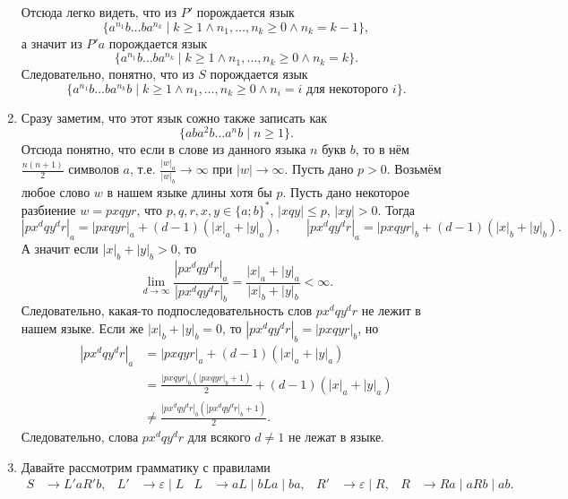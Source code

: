 \documentclass[12pt,a4paper]{article}
\begin{document}
\begin{problem}{3}
\begin{enumerate}
                Отсюда легко видеть, что из $P'$ порождается язык
                \[\{a^{n_1} b \dots b a^{n_k} \mid k \geqslant 1 \wedge n_1, \dots, n_k \geqslant 0 \wedge n_k = k-1\},\]
                а значит из $P'a$ порождается язык
                \[\{a^{n_1} b \dots b a^{n_k} \mid k \geqslant 1 \wedge n_1, \dots, n_k \geqslant 0 \wedge n_k = k\}.\]
                Следовательно, понятно, что из $S$ порождается язык
                \[\{a^{n_1} b \dots b a^{n_k} b \mid k \geqslant 1 \wedge n_1, \dots, n_k \geqslant 0 \wedge n_i = i \text{ для некоторого $i$}\}.\]

            \item Сразу заметим, что этот язык сожно также записать как
                \[\{aba^2b \dots a^n b \mid n \geqslant 1\}.\]
                Отсюда понятно, что если в слове из данного языка $n$ букв $b$, то в нём $\frac{n(n+1)}{2}$ символов $a$, т.е. $\frac{|w|_a}{|w|_b} \to \infty$ при $|w| \to \infty$. Пусть дано $p > 0$. Возьмём любое слово $w$ в нашем языке длины хотя бы $p$. Пусть дано некоторое разбиение $w = pxqyr$, что $p, q, r, x, y \in \{a; b\}^*$, $|xqy| \leqslant p$, $|xy| > 0$. Тогда
                \[|p x^d q y^d r|_a = |pxqyr|_a + (d-1)(|x|_a + |y|_a), \qquad |p x^d q y^d r|_a = |pxqyr|_b + (d-1)(|x|_b + |y|_b).\]
                А значит если $|x|_b + |y|_b > 0$, то
                \[\lim_{d \to \infty} \frac{|p x^d q y^d r|_a}{|p x^d q y^d r|_b} = \frac{|x|_a + |y|_a}{|x|_b + |y|_b} < \infty.\]
                Следовательно, какая-то подпоследовательность слов $p x^d q y^d r$ не лежит в нашем языке. Если же $|x|_b + |y|_b = 0$, то $|p x^d q y^d r|_b = |pxqyr|_b$, но
                \begin{align*}
                    |p x^d q y^d r|_a
                    &= |pxqyr|_a + (d-1)(|x|_a + |y|_a)\\
                    &= \frac{|pxqyr|_b(|pxqyr|_b + 1)}{2} + (d-1)(|x|_a + |y|_a)\\
                    &\neq \frac{|px^dqy^dr|_b(|px^dqy^dr|_b + 1)}{2}.
                \end{align*}
                Следовательно, слова $p x^d q y^d r$ для всякого $d \neq 1$ не лежат в языке.

            \item Давайте рассмотрим грамматику с правилами
                \begin{align*}
                    S &\to L'aR'b,&
                    L' &\to \varepsilon \mid L&
                    L &\to aL \mid bLa \mid ba,&
                    R' &\to \varepsilon \mid R,&
                    R &\to Ra \mid aRb \mid ab.
                \end{align*}


\end{enumerate}
\end{problem}
\end{document}
